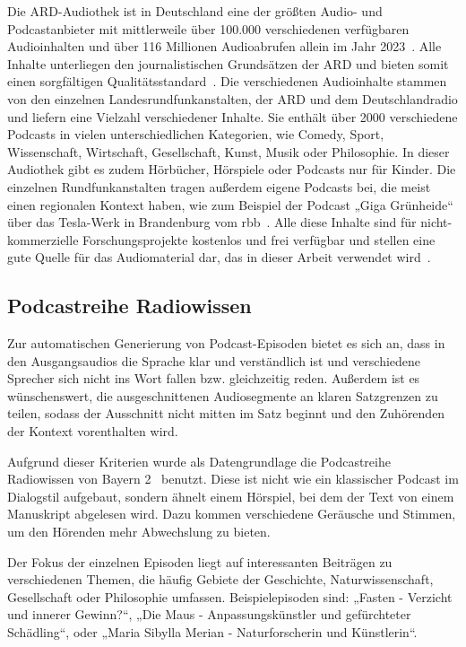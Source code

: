 Die ARD-Audiothek ist in Deutschland eine der größten Audio- und Podcastanbieter mit mittlerweile über 100.000 verschiedenen verfügbaren Audioinhalten und über 116 Millionen Audioabrufen allein im Jahr 2023~\cite{2024a}.
Alle Inhalte unterliegen den journalistischen Grundsätzen der ARD und bieten somit einen sorgfältigen Qualitätsstandard~\cite{2024b}.
Die verschiedenen Audioinhalte stammen von den einzelnen Landesrundfunkanstalten, der ARD und dem Deutschlandradio und liefern eine Vielzahl verschiedener Inhalte.
Sie enthält über 2000 verschiedene Podcasts in vielen unterschiedlichen Kategorien, wie Comedy, Sport, Wissenschaft, Wirtschaft, Gesellschaft, Kunst, Musik oder Philosophie.
In dieser Audiothek gibt es zudem Hörbücher, Hörspiele oder Podcasts nur für Kinder.
Die einzelnen Rundfunkanstalten tragen außerdem eigene Podcasts bei, die meist einen regionalen Kontext haben, wie zum Beispiel der Podcast „Giga Grünheide“ über das Tesla-Werk in Brandenburg vom rbb~\cite{zotero-523}.
Alle diese Inhalte sind für nicht-kommerzielle Forschungsprojekte kostenlos und frei verfügbar und stellen eine gute Quelle für das Audiomaterial dar, das in dieser Arbeit verwendet wird~\cite{zotero-525}.

\subsection{Podcastreihe Radiowissen}

Zur automatischen Generierung von Podcast-Episoden bietet es sich an, dass in den Ausgangsaudios die Sprache klar und verständlich ist und verschiedene Sprecher sich nicht ins Wort fallen bzw. gleichzeitig reden.
Außerdem ist es wünschenswert, die ausgeschnittenen Audiosegmente an klaren Satzgrenzen zu teilen, sodass der Ausschnitt nicht mitten im Satz beginnt und den Zuhörenden der Kontext vorenthalten wird.

Aufgrund dieser Kriterien wurde als Datengrundlage die Podcastreihe Radiowissen von Bayern 2~\cite{zotero-527} benutzt.
Diese ist nicht wie ein klassischer Podcast im Dialogstil aufgebaut, sondern ähnelt einem Hörspiel, bei dem der Text von einem Manuskript abgelesen wird.
Dazu kommen verschiedene Geräusche und Stimmen, um den Hörenden mehr Abwechslung zu bieten.

Der Fokus der einzelnen Episoden liegt auf interessanten Beiträgen zu verschiedenen Themen, die häufig Gebiete der Geschichte, Naturwissenschaft, Gesellschaft oder Philosophie umfassen.
Beispielepisoden sind: „Fasten - Verzicht und innerer Gewinn?“, „Die Maus - Anpassungskünstler und gefürchteter Schädling“, oder „Maria Sibylla Merian - Naturforscherin und Künstlerin“.~\cite{zotero-527}

